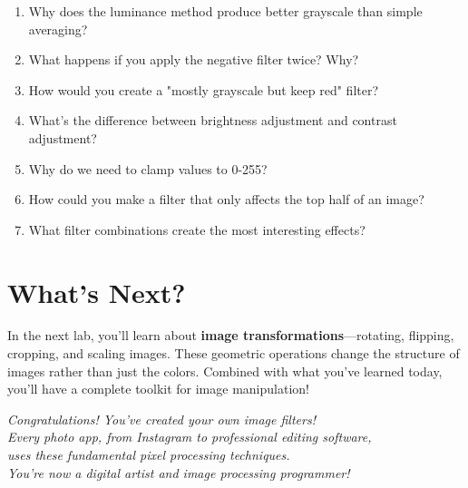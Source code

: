 \documentclass[11pt]{article}
\begin{document}
\begin{enumerate}
    \item Why does the luminance method produce better grayscale than simple averaging?
    \item What happens if you apply the negative filter twice? Why?
    \item How would you create a "mostly grayscale but keep red" filter?
    \item What's the difference between brightness adjustment and contrast adjustment?
    \item Why do we need to clamp values to 0-255?
    \item How could you make a filter that only affects the top half of an image?
    \item What filter combinations create the most interesting effects?
\end{enumerate}

\section*{What's Next?}

In the next lab, you'll learn about \textbf{image transformations}—rotating, flipping, cropping, and scaling images. These geometric operations change the structure of images rather than just the colors. Combined with what you've learned today, you'll have a complete toolkit for image manipulation!

\vspace{2em}

\begin{center}
\textit{Congratulations! You've created your own image filters!\\
Every photo app, from Instagram to professional editing software,\\
uses these fundamental pixel processing techniques.\\
You're now a digital artist and image processing programmer!}
\end{center}
\end{document}
